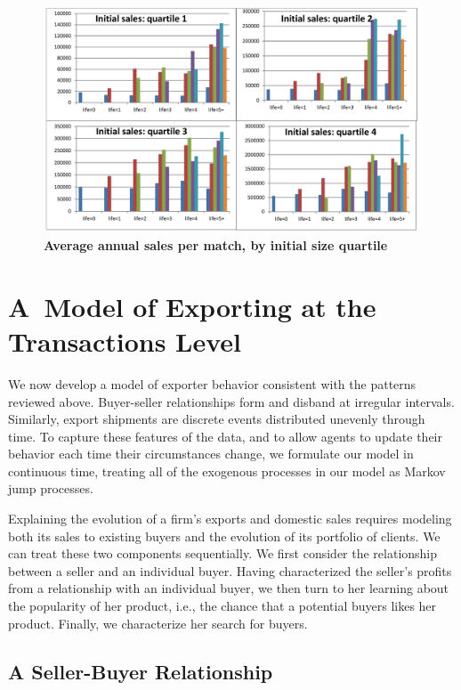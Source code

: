 \documentclass[12pt]{article}
\begin{document}
\begin{center}
\begin{figure}[tbp]
\includegraphics[width=\textwidth]{figures/Figure_1_quadrants_v2.png}
\caption{\textbf{Average annual sales per match, by initial size quartile}}
\label{fig:match_maturation}
\end{figure}
\end{center}

\section{A\ Model of Exporting at the Transactions Level}

We now develop a model of exporter behavior consistent with the patterns
reviewed above. Buyer-seller relationships form and disband at irregular
intervals. Similarly, export shipments are discrete events distributed
unevenly through time. To capture these features of the data, and to allow
agents to update their behavior each time their circumstances change, we
formulate our model in continuous time, treating all of the exogenous
processes in our model as Markov jump processes.

Explaining the evolution of a firm's exports and domestic sales requires
modeling both its sales to existing buyers and the evolution of its
portfolio of clients. We can treat these two components sequentially. We
first consider the relationship between a seller and an individual buyer.
Having characterized the seller's profits from a relationship with an
individual buyer, we then turn to her learning about the popularity of her
product, i.e., the chance that a potential buyers likes her product.
Finally, we characterize her search for buyers.

\subsection{A Seller-Buyer Relationship}
\end{document}
